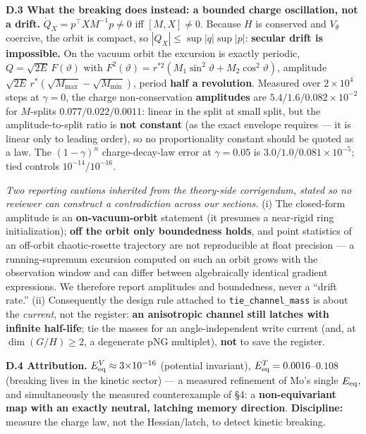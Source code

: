 \documentclass[10pt]{article}
\begin{document}
\textbf{D.3 What the breaking does instead: a bounded charge oscillation, not a drift.} $\dot Q_X=p^\top XM^{-1}p\ne0$ iff $[M,X]\ne0$. Because $H$ is conserved and $V_\theta$ coercive, the orbit is compact, so $|Q_X|\le\sup|q|\sup|p|$: \textbf{secular drift is impossible.} On the vacuum orbit the excursion is exactly periodic, $Q=\sqrt{2E}\,F(\vartheta)$ with $F^2(\vartheta)=r^{*2}(M_1\sin^2\vartheta+M_2\cos^2\vartheta)$, amplitude $\sqrt{2E}\,r^*(\sqrt{M_{\max}}-\sqrt{M_{\min}})$, period \textbf{half a revolution}. Measured over $2{\times}10^4$ steps at $\gamma{=}0$, the charge non-conservation \textbf{amplitudes} are $5.4/1.6/0.082{\times}10^{-2}$ for $M$-splits $0.077/0.022/0.0011$: linear in the split at small split, but the amplitude-to-split ratio is \textbf{not constant} (as the exact envelope requires --- it is linear only to leading order), so no proportionality constant should be quoted as a law. The $(1-\gamma)^n$ charge-decay-law error at $\gamma{=}0.05$ is $3.0/1.0/0.081{\times}10^{-5}$; tied controls $10^{-14}$/$10^{-16}$.

\emph{Two reporting cautions inherited from the theory-side corrigendum, stated so no reviewer can construct a contradiction across our sections.} (i) The closed-form amplitude is an \textbf{on-vacuum-orbit} statement (it presumes a near-rigid ring initialization); \textbf{off the orbit only boundedness holds}, and point statistics of an off-orbit chaotic-rosette trajectory are not reproducible at float precision --- a running-supremum excursion computed on such an orbit grows with the observation window and can differ between algebraically identical gradient expressions. We therefore report amplitudes and boundedness, never a ``drift rate.'' (ii) Consequently the design rule attached to \texttt{tie\_channel\_mass} is about the \emph{current}, not the register: \textbf{an anisotropic channel still latches with infinite half-life}; tie the masses for an angle-independent write current (and, at $\dim(G/H)\ge2$, a degenerate pNG multiplet), \textbf{not} to save the register.

\textbf{D.4 Attribution.} $E^V_{\rm eq}\approx3{\times}10^{-16}$ (potential invariant), $E^T_{\rm eq}=0.0016$--$0.108$ (breaking lives in the kinetic sector) --- a measured refinement of Mo's single $E_{\rm eq}$, and simultaneously the measured counterexample of \S4: a \textbf{non-equivariant map with an exactly neutral, latching memory direction}. \textbf{Discipline:} measure the charge law, not the Hessian/latch, to detect kinetic breaking.
\end{document}
